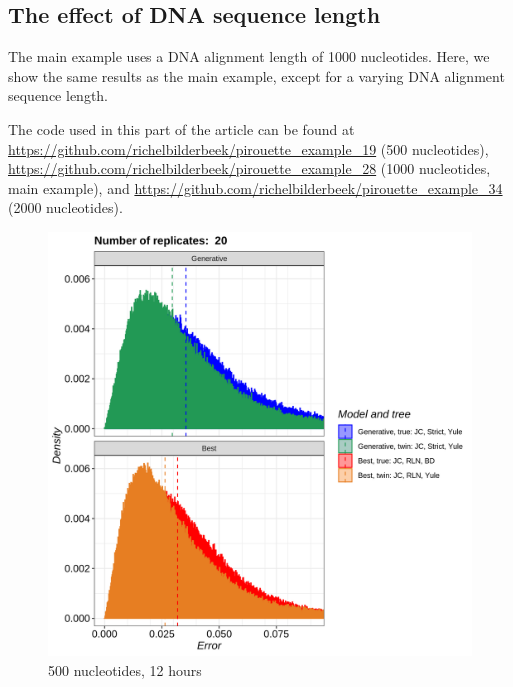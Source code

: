 \subsection{The effect of DNA sequence length}
\label{subsec:n_nucleotides}

The main example uses a DNA alignment length of 1000 nucleotides.
Here, we show the same results as the main example,
except for a varying DNA alignment sequence length.

The code used in this part of the article can be found at 
\url{https://github.com/richelbilderbeek/pirouette_example_19} (500 nucleotides),
\url{https://github.com/richelbilderbeek/pirouette_example_28} (1000 nucleotides, main example),
and \url{https://github.com/richelbilderbeek/pirouette_example_34} (2000 nucleotides).

\begin{figure}[H]
  \includegraphics[width=\textwidth]{pirouette_example_19/errors.png}
  \caption{500 nucleotides, 12 hours}
\end{figure}

